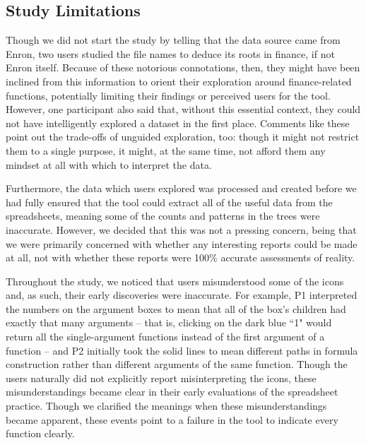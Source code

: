 \documentclass[conference]{IEEEtran}
\begin{document}
	\subsection{Study Limitations} \label{subsec:studylimitations} Though we did not start the study by telling
	that the data source came from Enron, two users studied the file names to
	deduce its roots in finance, if not Enron itself. Because of these notorious
	connotations, then, they might have been inclined from this information to
	orient their exploration around finance-related functions, potentially limiting
	their findings or perceived users for the tool. However, one participant also
	said that, without this essential context, they could not have intelligently
	explored a dataset in the first place. Comments like these point out the
	trade-offs of unguided exploration, too: though it might not restrict them to a
	single purpose, it might, at the same time, not afford them any mindset at all
	with which to interpret the data. \par
	
	Furthermore, the data which users explored was processed and created before we
	had fully ensured that the tool could extract all of the useful data from the
	spreadsheets, meaning some of the counts and patterns in the trees were
	inaccurate. However, we decided that this was not a pressing concern, being
	that we were primarily concerned with whether any interesting reports could be
	made at all, not with whether these reports were 100\% accurate assessments of
	reality. \par
	
	Throughout the study, we noticed that users misunderstood some of the icons
	and, as such, their early discoveries were inaccurate. For example, P1
	interpreted the numbers on the argument boxes to mean that all of the box's
	children had exactly that many arguments -- that is, clicking on the dark blue
	``1" would return all the single-argument functions instead of the first
	argument of a function -- and P2 initially took the solid lines to mean
	different paths in formula construction rather than different arguments of the
	same function. Though the users naturally did not explicitly report
	misinterpreting the icons, these misunderstandings became clear in their early
	evaluations of the spreadsheet practice. Though we clarified the meanings when
	these misunderstandings became apparent, these events point to a failure in the
	tool to indicate every function clearly.   \par
	
\end{document}
